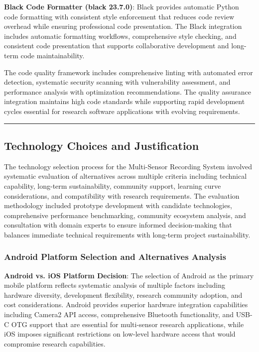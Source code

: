 \documentclass[12pt,a4paper]{article}
\begin{document}
\textbf{Black Code Formatter (black 23.7.0)}: Black provides automatic Python code formatting with consistent style
enforcement that reduces code review overhead while ensuring professional code presentation. The Black integration
includes automatic formatting workflows, comprehensive style checking, and consistent code presentation that supports
collaborative development and long-term code maintainability.

The code quality framework includes comprehensive linting with automated error detection, systematic security scanning
with vulnerability assessment, and performance analysis with optimization recommendations. The quality assurance
integration maintains high code standards while supporting rapid development cycles essential for research software
applications with evolving requirements.

\hrule

\subsection{Technology Choices and Justification}

The technology selection process for the Multi-Sensor Recording System involved systematic evaluation of alternatives
across multiple criteria including technical capability, long-term sustainability, community support, learning curve
considerations, and compatibility with research requirements. The evaluation methodology included prototype development
with candidate technologies, comprehensive performance benchmarking, community ecosystem analysis, and consultation with
domain experts to ensure informed decision-making that balances immediate technical requirements with long-term project
sustainability.

\subsubsection{Android Platform Selection and Alternatives Analysis}

\textbf{Android vs. iOS Platform Decision}: The selection of Android as the primary mobile platform reflects systematic
analysis of multiple factors including hardware diversity, development flexibility, research community adoption, and
cost considerations. Android provides superior hardware integration capabilities including Camera2 API access,
comprehensive Bluetooth functionality, and USB-C OTG support that are essential for multi-sensor research applications,
while iOS imposes significant restrictions on low-level hardware access that would compromise research capabilities.
\end{document}
